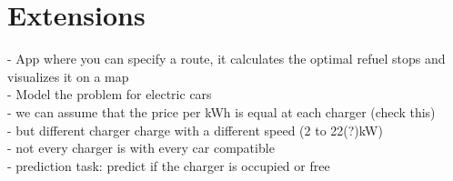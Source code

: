 \documentclass[%
a4paper,
DIV12,
2.5headlines,
bigheadings,
titlepage,
openbib,
]{scrartcl}
\begin{document}
\section{Extensions}\label{extensions}
- App where you can specify a route, it calculates the optimal refuel stops and visualizes it on a map\\ 
- Model the problem for electric cars\\
 - we can assume that the price per kWh is equal at each charger (check this)\\
 - but different charger charge with a different speed (2 to 22(?)kW)\\
 - not every charger is with every car compatible\\
 - prediction task: predict if the charger is occupied or free\\


 
\end{document}
